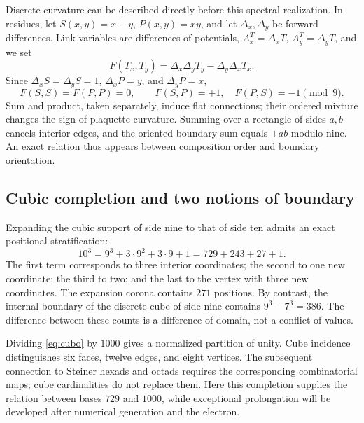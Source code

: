Discrete curvature can be described directly before this spectral realization. In residues, let \(S(x,y)=x+y\), \(P(x,y)=xy\), and let \(\Delta_x,\Delta_y\) be forward differences. Link variables are differences of potentials, \(A_x^T=\Delta_xT\), \(A_y^T=\Delta_yT\), and we set
\[
 F(T_x,T_y)=\Delta_x\Delta_yT_y-\Delta_y\Delta_xT_x.
\]
Since \(\Delta_xS=\Delta_yS=1\), \(\Delta_xP=y\), and \(\Delta_yP=x\),
\begin{equation}
 F(S,S)=F(P,P)=0,\qquad F(S,P)=+1,\quad F(P,S)=-1\pmod9.
\end{equation}
Sum and product, taken separately, induce flat connections; their ordered mixture changes the sign of plaquette curvature. Summing over a rectangle of sides \(a,b\) cancels interior edges, and the oriented boundary sum equals \(\pm ab\) modulo nine. An exact relation thus appears between composition order and boundary orientation.

\subsection{Cubic completion and two notions of boundary}

Expanding the cubic support of side nine to that of side ten admits an exact positional stratification:
\begin{equation}
 10^3=9^3+3\cdot9^2+3\cdot9+1=729+243+27+1.
 \label{eq:cubo}
\end{equation}
The first term corresponds to three interior coordinates; the second to one new coordinate; the third to two; and the last to the vertex with three new coordinates. The expansion corona contains \(271\) positions. By contrast, the internal boundary of the discrete cube of side nine contains \(9^3-7^3=386\). The difference between these counts is a difference of domain, not a conflict of values.

Dividing \eqref{eq:cubo} by \(1000\) gives a normalized partition of unity. Cube incidence distinguishes six faces, twelve edges, and eight vertices. The subsequent connection to Steiner hexads and octads requires the corresponding combinatorial maps; cube cardinalities do not replace them. Here this completion supplies the relation between bases \(729\) and \(1000\), while exceptional prolongation will be developed after numerical generation and the electron.





